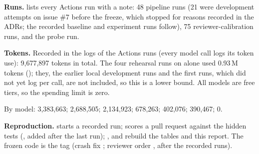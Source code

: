 \textbf{Runs.}  lists every Actions run with a note: 48 pipeline runs (21 were development attempts on issue \#7 before the freeze, which stopped for reasons recorded in the ADRs; the recorded baseline and experiment runs follow), 75 reviewer-calibration runs, and the probe run.

\textbf{Tokens.} Recorded in the logs of the Actions runs (every model call logs its token use): 9,677,897 tokens in total. The four rehearsal runs on  alone used 0.93\,M tokens (); they, the earlier local development runs and the first runs, which did not yet log per call, are not included, so this is a lower bound. All models are free tiers, so the spending limit is zero.

By model:  3,383,663;  2,688,505;  2,134,923;  678,263;  402,076;  390,467;  0.

\textbf{Reproduction.}  starts a recorded run;  scores a pull request against the hidden tests (, added after the last run); ,  and  rebuild the tables and this report. The frozen code is the tag  (crash fix ; reviewer order , after the recorded runs).